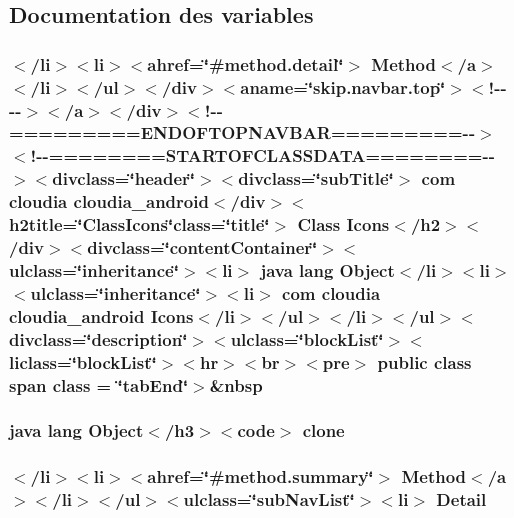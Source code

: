 \subsection{Documentation des variables}
\hypertarget{_icons_8html_aaf74e68f01dfd23f92e9ab5356b503d5}{
\subsubsection[{class}]{\setlength{\rightskip}{0pt plus 5cm}$<$/li$>$$<$li$>$$<$ahref=\char`\"{}\#method.\-detail\char`\"{}$>$ Method$<$/{\bf a}$>$$<$/li$>$$<$/ul$>$$<$/div$>$$<$aname=\char`\"{}skip.\-navbar.\-top\char`\"{}$>$$<$!-\/-\/-\/-\/$>$$<$/a$>$$<$/div$>$$<$!-\/-\/=========E\-N\-D\-O\-F\-T\-O\-P\-N\-A\-V\-B\-A\-R=========-\/-\/$>$$<$!-\/-\/========S\-T\-A\-R\-T\-O\-F\-C\-L\-A\-S\-S\-D\-A\-T\-A========-\/-\/$>$$<$divclass=\char`\"{}header\char`\"{}$>$$<$divclass=\char`\"{}sub\-Title\char`\"{}$>$ com cloudia cloudia\-\_\-android$<$/div$>$$<$h2title=\char`\"{}Class\-Icons\char`\"{}class=\char`\"{}title\char`\"{}$>$ Class {\bf Icons}$<$/h2$>$$<$/div$>$$<$divclass=\char`\"{}content\-Container\char`\"{}$>$$<$ulclass=\char`\"{}inheritance\char`\"{}$>$$<$li$>$ java lang Object$<$/li$>$$<$li$>$$<$ulclass=\char`\"{}inheritance\char`\"{}$>$$<$li$>$ com cloudia cloudia\-\_\-android {\bf Icons}$<$/li$>$$<$/ul$>$$<$/li$>$$<$/ul$>$$<$divclass=\char`\"{}description\char`\"{}$>$$<$ulclass=\char`\"{}block\-List\char`\"{}$>$$<$liclass=\char`\"{}block\-List\char`\"{}$>$$<$hr$>$$<$br$>$$<$pre$>$ public class {\bf span} class = \char`\"{}tab\-End\char`\"{}$>$\&nbsp}}\label{_icons_8html_aaf74e68f01dfd23f92e9ab5356b503d5}
\hypertarget{_icons_8html_adc9607fcabf6f2d7f401ad52015ef6e0}{
\subsubsection[{clone}]{\setlength{\rightskip}{0pt plus 5cm}java lang Object$<$/h3$>$$<$code$>$ clone}}\label{_icons_8html_adc9607fcabf6f2d7f401ad52015ef6e0}
\hypertarget{_icons_8html_a1e04b5ec07bcd5281e26dcd40e5b3a94}{
\subsubsection[{Detail}]{\setlength{\rightskip}{0pt plus 5cm}$<$/li$>$$<$li$>$$<$ahref=\char`\"{}\#method.\-summary\char`\"{}$>$ Method$<$/{\bf a}$>$$<$/li$>$$<$/ul$>$$<$ulclass=\char`\"{}sub\-Nav\-List\char`\"{}$>$$<$li$>$ Detail}}\label{_icons_8html_a1e04b5ec07bcd5281e26dcd40e5b3a94}
